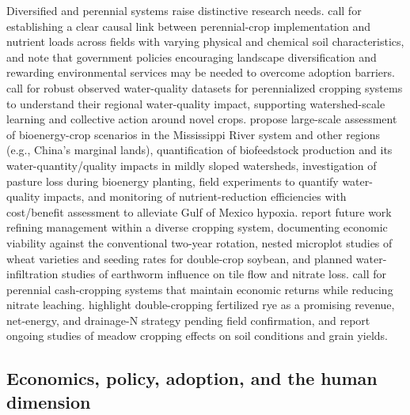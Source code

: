Diversified and perennial systems raise distinctive research needs. \textcite{Arrueta2022} call for establishing a clear causal link between perennial-crop implementation and nutrient loads across fields with varying physical and chemical soil characteristics, and note that government policies encouraging landscape diversification and rewarding environmental services may be needed to overcome adoption barriers. \textcite{Wilson2023} call for robust observed water-quality datasets for perennialized cropping systems to understand their regional water-quality impact, supporting watershed-scale learning and collective action around novel crops. \textcite{Guo2018} propose large-scale assessment of bioenergy-crop scenarios in the Mississippi River system and other regions (e.g., China's marginal lands), quantification of biofeedstock production and its water-quantity/quality impacts in mildly sloped watersheds, investigation of pasture loss during bioenergy planting, field experiments to quantify water-quality impacts, and monitoring of nutrient-reduction efficiencies with cost/benefit assessment to alleviate Gulf of Mexico hypoxia. \textcite{Gentry2025} report future work refining management within a diverse cropping system, documenting economic viability against the conventional two-year rotation, nested microplot studies of wheat varieties and seeding rates for double-crop soybean, and planned water-infiltration studies of earthworm influence on tile flow and nitrate loss. \textcite{Dinnes2002} call for perennial cash-cropping systems that maintain economic returns while reducing nitrate leaching. \textcite{Malone2018} highlight double-cropping fertilized rye as a promising revenue, net-energy, and drainage-N strategy pending field confirmation, and \textcite{HUNDAL1976} report ongoing studies of meadow cropping effects on soil conditions and grain yields.

\subsection{Economics, policy, adoption, and the human dimension}

